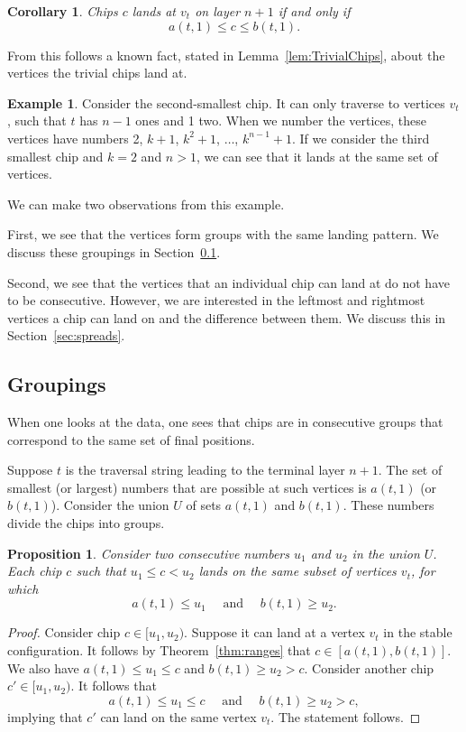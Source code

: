\documentclass[11pt]{article}
\newtheorem{corollary}{Corollary}[theorem] %
\newtheorem{proposition}[theorem]{Proposition}
\theoremstyle{definition}
\newtheorem{example}{Example}
\theoremstyle{remark}
\begin{document}
\begin{corollary}
    Chips $c$ lands at $v_t$ on layer $n+1$ if and only if \[a(t, 1) \leq c \leq b(t, 1).\]
\end{corollary}
From this follows a known fact, stated in Lemma~\ref{lem:TrivialChips}, about the vertices the trivial chips land at.

\begin{example}
    Consider the second-smallest chip. It can only traverse to vertices $v_t$, such that $t$ has $n-1$ ones and 1 two. When we number the vertices, these vertices have numbers 2, $k+1$, $k^2+1$, $\dots$, $k^{n-1} + 1$. If we consider the third smallest chip and $k = 2$ and $n > 1$, we can see that it lands at the same set of vertices.
\end{example}

We can make two observations from this example. 

First, we see that the vertices form groups with the same landing pattern. We discuss these groupings in Section~\ref{sec:groupings}. 

Second, we see that the vertices that an individual chip can land at do not have to be consecutive. However, we are interested in the leftmost and rightmost vertices a chip can land on and the difference between them. We discuss this in Section~\ref{sec:spreads}.




\subsection{Groupings}
\label{sec:groupings}

When one looks at the data, one sees that chips are in consecutive groups that correspond to the same set of final positions. 

Suppose $t$ is the traversal string leading to the terminal layer $n+1$. The set of smallest (or largest) numbers that are possible at such vertices is $a(t,1)$ (or $b(t,1)$). Consider the union $U$ of sets $a(t,1)$ and $b(t,1)$. These numbers divide the chips into groups.

\begin{proposition}
    Consider two consecutive numbers $u_1$ and $u_2$ in the union $U$. Each chip $c$ such that $u_1 \leq c < u_2$ lands on the same subset of vertices $v_t$, for which
    \[a(t, 1) \leq u_1 \quad \textrm{ and } \quad b(t, 1) \geq u_2.\]
\end{proposition}

\begin{proof}
Consider chip $c \in [u_1, u_2)$. Suppose it can land at a vertex $v_t$ in the stable configuration. It follows by Theorem~\ref{thm:ranges} that $c \in [a(t,1), b(t, 1)]$. We also have $a(t, 1) \leq u_1 \leq c$ and $b(t, 1) \geq u_2 > c$. Consider another chip $c' \in [u_1, u_2)$. It follows that
\[a(t, 1) \leq u_1 \leq c \quad \textrm{ and } \quad b(t, 1) \geq u_2 > c,\]
implying that $c'$ can land on the same vertex $v_t$. The statement follows.
\end{proof}
\end{document}
